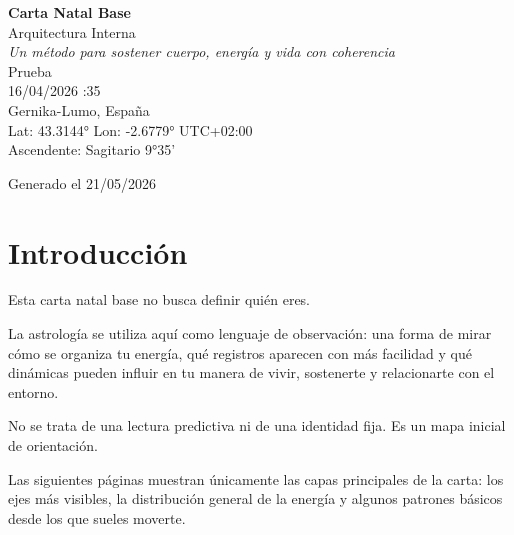\documentclass[11pt,a4paper]{article}
\begin{document}

\begin{titlepage}

\centering

\vspace*{1.5cm}

{\Huge\bfseries\color{azulai} Carta Natal Base}\\[0.5cm]

{\large\color{grisai} Arquitectura Interna}\\[0.4cm]

{\small\itshape\color{grisai}
Un método para sostener cuerpo, energía y vida con coherencia
}\\[2cm]

{\huge\color{doradoai} Prueba}\\[1.5cm]

{\Large 16/04/2026 :35}\\[0.3cm]

{\Large Gernika-Lumo, España}\\[0.3cm]

{\normalsize
Lat: 43.3144° \quad
Lon: -2.6779° \quad
UTC+02:00
}\\[0.5cm]

{\normalsize
Ascendente: Sagitario 9°35'
}\\[2.5cm]

\vfill

{\small Generado el 21/05/2026}

\end{titlepage}



\section*{Introducción}

Esta carta natal base no busca definir quién eres.

La astrología se utiliza aquí como lenguaje de observación:
una forma de mirar cómo se organiza tu energía,
qué registros aparecen con más facilidad
y qué dinámicas pueden influir en tu manera de vivir, sostenerte y relacionarte con el entorno.

No se trata de una lectura predictiva ni de una identidad fija.
Es un mapa inicial de orientación.

Las siguientes páginas muestran únicamente las capas principales de la carta:
los ejes más visibles,
la distribución general de la energía
y algunos patrones básicos desde los que sueles moverte.
\end{document}
